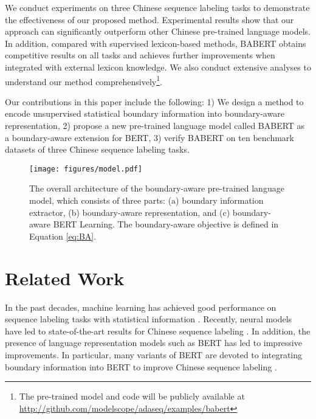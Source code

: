 \documentclass[11pt]{article}
\begin{document}
\begin{CJK}{UTF8}{gbsn}
We conduct experiments on three Chinese sequence labeling tasks to demonstrate the effectiveness of our proposed method.
Experimental results show that our approach can significantly outperform other Chinese pre-trained language models.
In addition, compared with supervised lexicon-based methods, BABERT obtains competitive results on all tasks and achieves further improvements when integrated with external lexicon knowledge.
We also conduct extensive analyses to understand our method comprehensively\footnote{The pre-trained model and code will be publicly available at \url{http://github.com/modelscope/adaseq/examples/babert}}.


Our contributions in this paper include the following:
1) We design a method to encode unsupervised statistical boundary information into boundary-aware representation,
2) propose a new pre-trained language model called BABERT as a boundary-aware extension for BERT,
3) verify BABERT on ten benchmark datasets of three Chinese sequence labeling tasks.

















\begin{figure*}
  \centering
  \texttt{[image: figures/model.pdf]}
  \caption{The overall architecture of the boundary-aware pre-trained language model, which consists of three parts:
  (a) boundary information extractor, (b) boundary-aware representation, and (c) boundary-aware BERT Learning. The boundary-aware objective  is defined in Equation \ref{eq:BA}.
}
  \label{fig:model}
\end{figure*}


\section{Related Work}
In the past decades, machine learning has achieved good performance on sequence labeling tasks with statistical information \cite{bellegarda2004statistical, low2005maximum, bouma2009normalized}.
Recently, neural models have led to state-of-the-art results for Chinese sequence labeling \cite{lample-etal-2016-neural, ma-hovy-2016-end, TACL792}.
In addition, the presence of language representation models such as BERT \cite{devlin2018bert} has led to impressive improvements.
In particular, many variants of BERT are devoted to integrating boundary information into BERT to improve Chinese sequence labeling \cite{diao-etal-2020-zen,jia-etal-2020-entity,liu-etal-2021-lexicon}.


\end{CJK}
\end{document}
